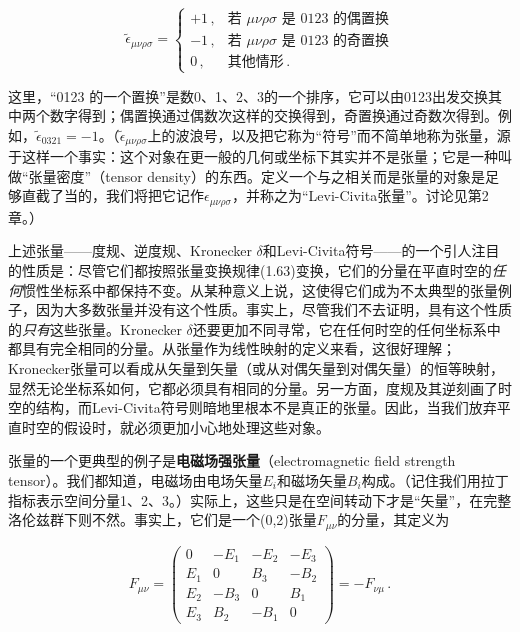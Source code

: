 \begin{equation*}
\tilde{\epsilon}_{\mu\nu\rho\sigma}=
\begin{cases}
+1\,, & \text{若 }\mu\nu\rho\sigma\text{ 是 0123 的偶置换}\\
-1\,, & \text{若 }\mu\nu\rho\sigma\text{ 是 0123 的奇置换}\\
0\,, & \text{其他情形}\,.
\end{cases}
\tag{1.68}
\end{equation*}

这里，“0123 的一个置换”是数0、1、2、3的一个排序，它可以由0123出发交换其中两个数字得到；偶置换通过偶数次这样的交换得到，奇置换通过奇数次得到。例如，$\tilde{\epsilon}_{0321}=-1$。（$\tilde{\epsilon}_{\mu\nu\rho\sigma}$上的波浪号，以及把它称为“符号”而不简单地称为张量，源于这样一个事实：这个对象在更一般的几何或坐标下其实并不是张量；它是一种叫做“张量密度”（tensor density）的东西。定义一个与之相关而是张量的对象是足够直截了当的，我们将把它记作$\epsilon_{\mu\nu\rho\sigma}$，并称之为“Levi-Civita张量”。讨论见第2章。）

上述张量——度规、逆度规、Kronecker $\delta$和Levi-Civita符号——的一个引人注目的性质是：尽管它们都按照张量变换规律(1.63)变换，它们的分量在平直时空的\emph{任何}惯性坐标系中都保持不变。从某种意义上说，这使得它们成为不太典型的张量例子，因为大多数张量并没有这个性质。事实上，尽管我们不去证明，具有这个性质的\emph{只有}这些张量。Kronecker $\delta$还要更加不同寻常，它在任何时空的任何坐标系中都具有完全相同的分量。从张量作为线性映射的定义来看，这很好理解；Kronecker张量可以看成从矢量到矢量（或从对偶矢量到对偶矢量）的恒等映射，显然无论坐标系如何，它都必须具有相同的分量。另一方面，度规及其逆刻画了时空的结构，而Levi-Civita符号则暗地里根本不是真正的张量。因此，当我们放弃平直时空的假设时，就必须更加小心地处理这些对象。

张量的一个更典型的例子是\textbf{电磁场强张量}（electromagnetic field strength tensor）。我们都知道，电磁场由电场矢量$E_i$和磁场矢量$B_i$构成。（记住我们用拉丁指标表示空间分量1、2、3。）实际上，这些只是在空间转动下才是“矢量”，在完整洛伦兹群下则不然。事实上，它们是一个(0,2)张量$F_{\mu\nu}$的分量，其定义为

\begin{equation*}
F_{\mu\nu}=
\begin{pmatrix}
0 & -E_1 & -E_2 & -E_3\\
E_1 & 0 & B_3 & -B_2\\
E_2 & -B_3 & 0 & B_1\\
E_3 & B_2 & -B_1 & 0
\end{pmatrix}
=-F_{\nu\mu}\,.
\tag{1.69}
\end{equation*}

